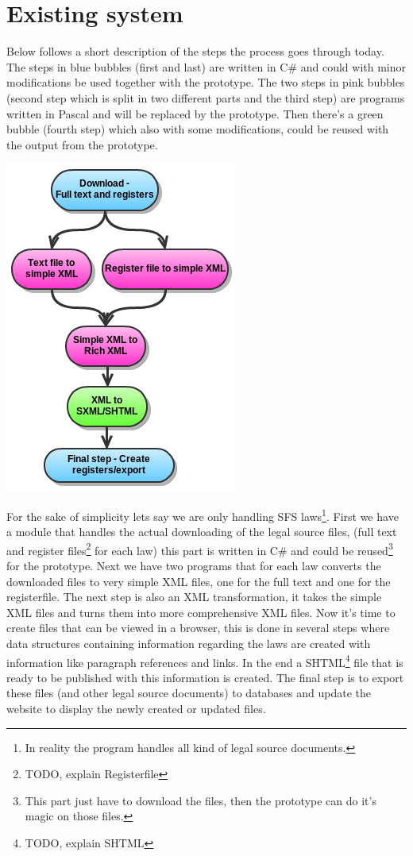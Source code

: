 \section{Existing system}
Below follows a short description of the steps the process goes through today. The steps in blue bubbles (first and last) are written in C\# and could with minor modifications be used together with the prototype. The two steps in pink bubbles (second step which is split in two different parts and the third step) are programs written in Pascal and will be replaced by the prototype. Then there's a green bubble (fourth step) which also with some modifications, could be reused with the output from the prototype.   
\begin{center}
\includegraphics[scale=0.6]{../imgs/oldSystemChart.png}
\end{center}
For the sake of simplicity lets say we are only handling SFS laws\footnote{In reality the program handles all kind of legal source documents.}. First we have a module that handles the actual downloading of the legal source files, (full text and register files\footnote{TODO, explain Registerfile} for each law) this part is written in C\# and could be reused\footnote{This part just have to download the files, then the prototype can do it's magic on those files.} for the prototype. Next we have two programs that for each law converts the downloaded files to very simple XML files, one for the full text and one for the registerfile. The next step is also an XML transformation, it takes the simple XML files and turns them into more comprehensive XML files. Now it's time to create files that can be viewed in a browser, this is done in several steps where data structures containing information regarding the laws are created with information like paragraph references and links. In the end a SHTML\footnote{TODO, explain SHTML} file that is ready to be published with this information is created. The final step is to export these files (and other legal source documents) to databases and update the website to display the newly created or updated files.

